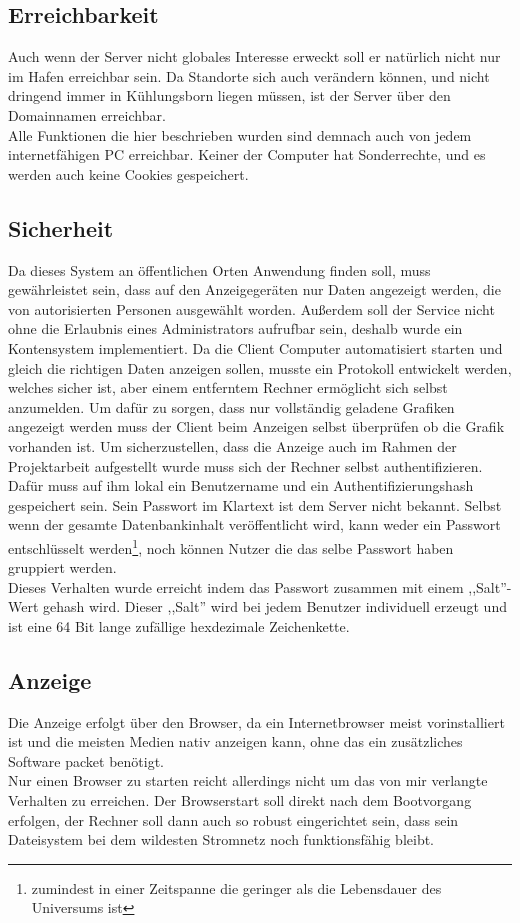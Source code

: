 \subsection{Erreichbarkeit} %
Auch wenn der Server nicht globales Interesse erweckt soll er natürlich nicht nur im Hafen erreichbar sein.
Da Standorte sich auch verändern können,
und nicht dringend immer in Kühlungsborn liegen müssen, ist der Server über den Domainnamen  erreichbar. \\
Alle Funktionen die hier beschrieben wurden sind demnach auch von jedem internetfähigen PC erreichbar. Keiner der Computer hat Sonderrechte,
und es werden auch keine Cookies gespeichert.

\subsection{Sicherheit} %
Da dieses System an öffentlichen Orten Anwendung finden soll,
muss gewährleistet sein, dass auf den Anzeigegeräten nur Daten angezeigt werden,
die von autorisierten Personen ausgewählt worden.
Außerdem soll der Service nicht ohne die Erlaubnis eines Administrators aufrufbar sein,
deshalb wurde ein Kontensystem implementiert.
Da die Client Computer automatisiert starten und gleich die richtigen Daten anzeigen sollen,
musste ein Protokoll entwickelt werden, welches sicher ist,
aber einem entferntem Rechner ermöglicht sich selbst anzumelden.
Um dafür zu sorgen, dass nur vollständig geladene Grafiken angezeigt werden muss
der Client beim Anzeigen selbst überprüfen ob die Grafik vorhanden ist.
Um sicherzustellen, dass die Anzeige auch im Rahmen der Projektarbeit aufgestellt
wurde muss sich der Rechner selbst authentifizieren.
Dafür muss auf ihm lokal ein Benutzername und ein
Authentifizierungshash gespeichert sein. Sein Passwort im Klartext ist dem Server nicht bekannt.
Selbst wenn der gesamte Datenbankinhalt veröffentlicht wird, kann weder ein Passwort
entschlüsselt werden\footnote{zumindest in einer Zeitspanne die
geringer als die Lebensdauer des Universums ist}, noch können Nutzer die das selbe Passwort haben
gruppiert werden.\\
Dieses Verhalten wurde erreicht indem das Passwort zusammen mit einem ,,Salt''-Wert gehash wird.
Dieser ,,Salt'' wird bei jedem Benutzer individuell erzeugt und ist eine 64 Bit lange zufällige hexdezimale Zeichenkette.

\subsection{Anzeige}
Die Anzeige erfolgt über den Browser, da ein Internetbrowser meist vorinstalliert ist
und die meisten Medien nativ anzeigen kann, ohne das ein zusätzliches Software packet
benötigt. \\
Nur einen Browser zu starten reicht allerdings nicht um das von mir verlangte Verhalten
zu erreichen. Der Browserstart soll direkt nach dem Bootvorgang erfolgen, der Rechner soll
dann auch so robust eingerichtet sein, dass sein Dateisystem bei dem wildesten Stromnetz
noch funktionsfähig bleibt.
